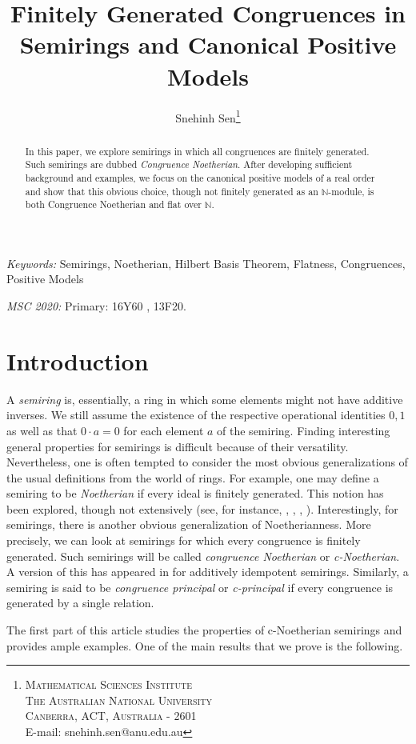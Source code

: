 \documentclass[notitlepage, 10pt]{article}
\title{Finitely Generated Congruences in Semirings and Canonical Positive Models}
\author{Snehinh Sen\footnote{\textsc{Mathematical Sciences Institute\\ The Australian National University\\ Canberra, ACT, Australia - 2601}\\
E-mail: snehinh.sen@anu.edu.au}}
\theoremstyle{defin}
\theoremstyle{theo}
\theoremstyle{rema}
\newcommand{\N}{\mathbb{N}}
\begin{document}
\maketitle

\begin{abstract}
In this paper, we explore semirings in which all congruences are finitely generated. Such semirings are dubbed \textit{Congruence Noetherian}. After developing sufficient background and examples, we focus on the canonical positive models of a real order and show that this obvious choice, though not finitely generated as an $\N$-module, is both Congruence Noetherian and flat over $\N$.
\end{abstract}

\textit{Keywords:} Semirings, Noetherian, Hilbert Basis Theorem, Flatness, Congruences, Positive Models

\textit{MSC 2020:} Primary: 16Y60 , 13F20.

\section{Introduction}\label{s1}

A \textit{semiring} is, essentially, a ring in which some elements might not have additive inverses. We still assume the existence of the respective operational identities $0, 1$ as well as that $0\cdot a = 0$ for each element $a$ of the semiring. Finding interesting general properties for semirings is difficult because of their versatility. Nevertheless, one is often tempted to consider the most obvious generalizations of the usual definitions from the world of rings. For example, one may define a semiring to be \textit{Noetherian} if every ideal is finitely generated. This notion has been explored, though not extensively (see, for instance, \cite{abuhlail2019knoetheriankartiniansemirings}, \cite{allencohen}, \cite{allenideal2006}, \cite{allenhilb1980}). Interestingly, for semirings, there is another obvious generalization of Noetherianness. More precisely, we can look at semirings for which every congruence is finitely generated. Such semirings will be called \textit{congruence Noetherian} or \textit{c-Noetherian}. A version of this has appeared in \cite{JooMincheva2017} for additively idempotent semirings. Similarly, a semiring is said to be \textit{congruence principal} or \textit{c-principal} if every congruence is generated by a single relation.

The first part of this article studies the properties of c-Noetherian semirings and provides ample examples. One of the main results that we prove is the following.
\end{document}
